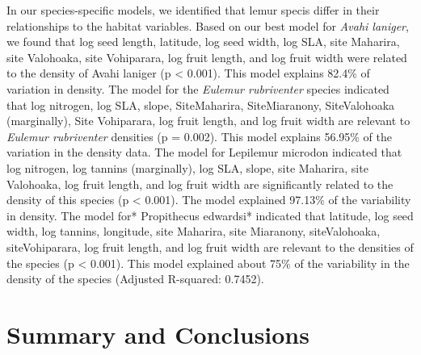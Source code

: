 \documentclass[
  12pt,
]{article}
\begin{document}
In our species-specific models, we identified that lemur specis differ
in their relationships to the habitat variables. Based on our best model
for \emph{Avahi laniger}, we found that log seed length, latitude, log
seed width, log SLA, site Maharira, site Valohoaka, site Vohiparara, log
fruit length, and log fruit width were related to the density of Avahi
laniger (p \textless{} 0.001). This model explains 82.4\% of variation
in density. The model for the \emph{Eulemur rubriventer} species
indicated that log nitrogen, log SLA, slope, SiteMaharira,
SiteMiaranony, SiteValohoaka (marginally), Site Vohiparara, log fruit
length, and log fruit width are relevant to \emph{Eulemur rubriventer}
densities (p = 0.002). This model explains 56.95\% of the variation in
the density data. The model for Lepilemur microdon indicated that log
nitrogen, log tannins (marginally), log SLA, slope, site Maharira, site
Valohoaka, log fruit length, and log fruit width are significantly
related to the density of this species (p \textless{} 0.001). The model
explained 97.13\% of the variability in density. The model for*
Propithecus edwardsi* indicated that latitude, log seed width, log
tannins, longitude, site Maharira, site Miaranony, siteValohoaka,
siteVohiparara, log fruit length, and log fruit width are relevant to
the densities of the species (p \textless{} 0.001). This model explained
about 75\% of the variability in the density of the species (Adjusted
R-squared: 0.7452).

\newpage

\hypertarget{summary-and-conclusions}{%
\section{Summary and Conclusions}\label{summary-and-conclusions}}
\end{document}

